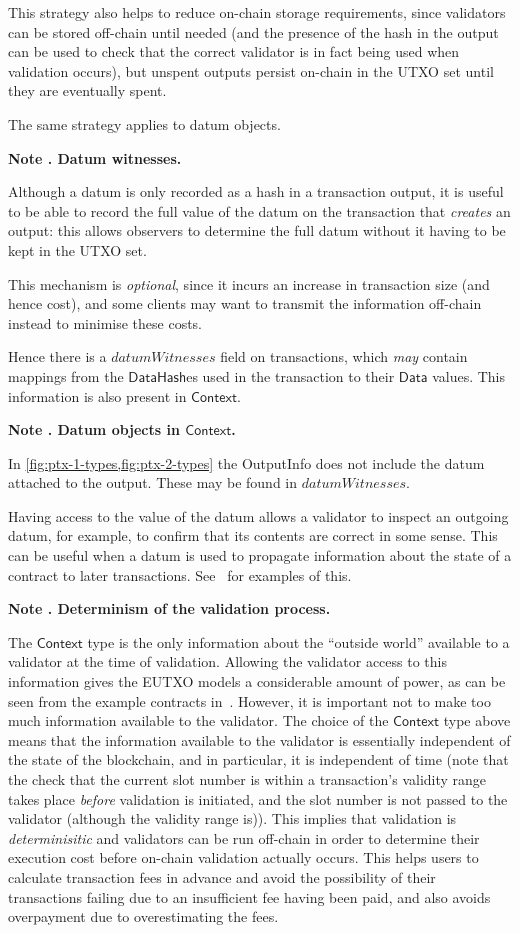 \documentclass[a4paper]{article}
\newcounter{note}
\newcommand{\note}[1]{
  \bigskip
  \refstepcounter{note}
  \noindent\textbf{Note \thenote. #1}
}
\newcommand{\s}{\textsf}  %
\newcommand{\mi}[1]{\ensuremath{\mathit{#1}}}
\newcommand{\ctx}{\ensuremath{\s{Context}}}
\newcommand{\DataHash}{\ensuremath{\s{DataHash}}}
\newcommand{\datumWits}{\mi{datumWitnesses}}
\newcommand{\Data}{\ensuremath{\s{Data}}}
\begin{document}
This strategy also helps to reduce on-chain
storage requirements, since validators can be stored off-chain until
needed (and the presence of the hash in the output can be used to
check that the correct validator is in fact being used when validation
occurs), but unspent outputs persist on-chain in the UTXO set until
they are eventually spent.

The same strategy applies to datum objects.

\note{Datum witnesses.}
\label{note:datum-witnesses}
Although a datum is only recorded as a hash in a transaction output,
it is useful to be able to record the full value of the datum on the
transaction that \emph{creates} an output: this allows observers to
determine the full datum without it having to be kept in the UTXO set.

This mechanism is \emph{optional}, since it incurs an increase in transaction
size (and hence cost), and some clients may want to transmit the information
off-chain instead to minimise these costs.

Hence there is a $\datumWits$ field on transactions, which \emph{may}
contain mappings from the $\DataHash$es used in the transaction to
their \Data{} values. This information is also present in \ctx{}.

\note{Datum objects in \ctx{}.}
\label{note:datum-objects-in-ptx}
In \cref{fig:ptx-1-types,fig:ptx-2-types} the
\textsf{OutputInfo} does not include the datum attached to the output.
These may be found in $\datumWits$.

Having access to the value of the datum allows a validator to inspect
an outgoing datum, for example, to confirm that its contents are
correct in some sense. This can be useful when a datum is used to
propagate information about the state of a contract to later
transactions.  See~\cite{Plutus-book} for examples of this.

\note{Determinism of the validation process.}
\label{note:validation-determinism} The \ctx{} type is the only
information about the ``outside world'' available to a validator
at the time of validation.  Allowing the validator access to
this information gives the EUTXO models a considerable amount of
power, as can be seen from the example contracts
in~\cite{Plutus-book}.  However, it is important not to make too much
information available to the validator.  The choice of the \ctx{} type
above means that the information available to the validator is
essentially independent of the state of the blockchain, and in
particular, it is independent of time (note that the check that the
current slot number is within a transaction's validity range takes
place \textit{before} validation is initiated, and the slot number is
not passed to the validator (although the validity range is)).  This
implies that validation is \textit{determinisitic} and validators can
be run off-chain in order to determine their execution cost before
on-chain validation actually occurs.  This helps users to calculate
transaction fees in advance and avoid the possibility of their
transactions failing due to an insufficient fee having been paid, and
also avoids overpayment due to overestimating the fees.
\end{document}
